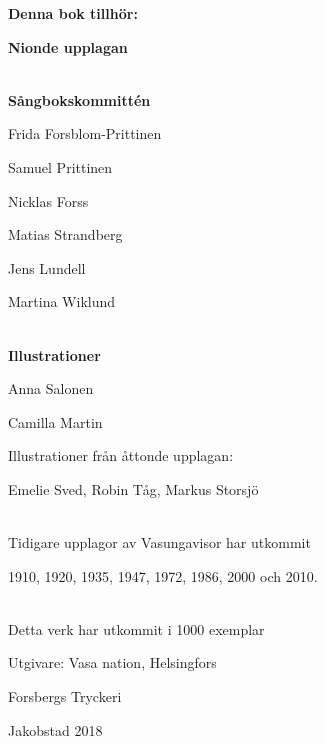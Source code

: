 
\begin{small}
\begin{center}
	\textbf{Denna bok tillhör:}
\end{center}
\end{small}
\vspace{0.5cm}
\hrulefill
\newpage
\begin{scriptsize}
\begin{center}
\textbf{Nionde upplagan}
~\\
~\\
{
\textbf{Sångbokskommittén}

Frida Forsblom-Prittinen

Samuel Prittinen

Nicklas Forss

Matias Strandberg

Jens Lundell

Martina Wiklund

~\\

\textbf{Illustrationer}


Anna Salonen

Camilla Martin

Illustrationer från åttonde upplagan:

Emelie Sved, Robin Tåg, Markus Storsjö

~\\

Tidigare upplagor av Vasungavisor har utkommit

1910, 1920, 1935, 1947, 1972, 1986, 2000 och 2010.

~\\

Detta verk har utkommit i 1000 exemplar

Utgivare: Vasa nation, Helsingfors

Forsbergs Tryckeri

Jakobstad 2018

}
\end{center}
\end{scriptsize}
